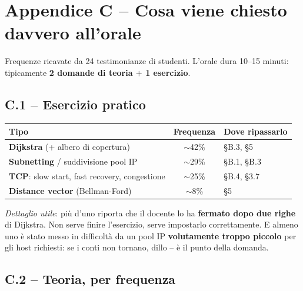 \documentclass[12pt, a4paper]{article}
\begin{document}
\bigskip

\section*{Appendice C -- Cosa viene chiesto davvero all'orale}

Frequenze ricavate da 24 testimonianze di studenti. L'orale dura 10--15 minuti: tipicamente \textbf{2 domande di teoria $+$ 1 esercizio}.

\subsection*{C.1 -- Esercizio pratico}

\begin{center}
\small
\begin{tabular}{lcl}
\toprule
\textbf{Tipo} & \textbf{Frequenza} & \textbf{Dove ripassarlo} \\
\midrule
\textbf{Dijkstra} (+ albero di copertura) & $\sim$42\% & \S B.3, \S5 \\
\textbf{Subnetting} / suddivisione pool IP & $\sim$29\% & \S B.1, \S B.3 \\
\textbf{TCP}: slow start, fast recovery, congestione & $\sim$25\% & \S B.4, \S3.7 \\
\textbf{Distance vector} (Bellman-Ford) & $\sim$8\% & \S5 \\
\bottomrule
\end{tabular}
\end{center}

\textit{Dettaglio utile}: più d'uno riporta che il docente lo ha \textbf{fermato dopo due righe} di Dijkstra. Non serve finire l'esercizio, serve impostarlo correttamente. E almeno uno è stato messo in difficoltà da un pool IP \textbf{volutamente troppo piccolo} per gli host richiesti: se i conti non tornano, dillo -- è il punto della domanda.

\subsection*{C.2 -- Teoria, per frequenza}
\end{document}
